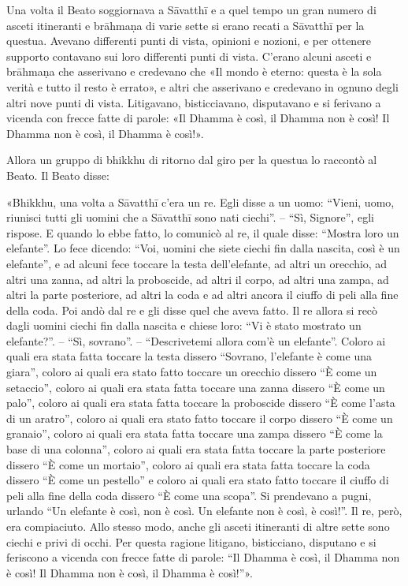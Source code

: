 

Una volta il Beato soggiornava a Sāvatthī e a quel tempo un gran numero
di asceti itineranti e brāhmaṇa di varie sette si erano recati a
Sāvatthī per la questua. Avevano differenti punti di vista, opinioni e
nozioni, e per ottenere supporto contavano sui loro differenti punti di
vista. C’erano alcuni asceti e brāhmaṇa che asserivano e credevano che
«Il mondo è eterno: questa è la sola verità e tutto il resto è errato»,
e altri che asserivano e credevano in ognuno degli altri nove punti di
vista. Litigavano, bisticciavano, disputavano e si ferivano a vicenda
con frecce fatte di parole: «Il Dhamma è così, il Dhamma non è così! Il
Dhamma non è così, il Dhamma è così!».


Allora un gruppo di bhikkhu di ritorno dal giro per la questua lo
raccontò al Beato. Il Beato disse:


«Bhikkhu, una volta a Sāvatthī c’era un re. Egli disse a un uomo:
“Vieni, uomo, riunisci tutti gli uomini che a Sāvatthī sono nati
ciechi”. – “Sì, Signore”, egli rispose. E quando lo ebbe fatto, lo
comunicò al re, il quale disse: “Mostra loro un elefante”. Lo fece
dicendo: “Voi, uomini che siete ciechi fin dalla nascita, così è un
elefante”, e ad alcuni fece toccare la testa dell’elefante, ad altri un
orecchio, ad altri una zanna, ad altri la proboscide, ad altri il corpo,
ad altri una zampa, ad altri la parte posteriore, ad altri la coda e ad
altri ancora il ciuffo di peli alla fine della coda. Poi andò dal re e
gli disse quel che aveva fatto. Il re allora si recò dagli uomini ciechi
fin dalla nascita e chiese loro: “Vi è stato mostrato un elefante?”. –
“Sì, sovrano”. – “Descrivetemi allora com’è un elefante”. Coloro ai
quali era stata fatta toccare la testa dissero “Sovrano, l’elefante è
come una giara”, coloro ai quali era stato fatto toccare un orecchio
dissero “È come un setaccio”, coloro ai quali era stata fatta toccare
una zanna dissero “È come un palo”, coloro ai quali era stata fatta
toccare la proboscide dissero “È come l’asta di un aratro”, coloro ai
quali era stato fatto toccare il corpo dissero “È come un granaio”,
coloro ai quali era stata fatta toccare una zampa dissero “È come la
base di una colonna”, coloro ai quali era stata fatta toccare la parte
posteriore dissero “È come un mortaio”, coloro ai quali era stata fatta
toccare la coda dissero “È come un pestello” e coloro ai quali era stato
fatto toccare il ciuffo di peli alla fine della coda dissero “È come una
scopa”. Si prendevano a pugni, urlando “Un elefante è così, non è così.
Un elefante non è così, è così!”. Il re, però, era compiaciuto. Allo
stesso modo, anche gli asceti itineranti di altre sette sono ciechi e
privi di occhi. Per questa ragione litigano, bisticciano, disputano e si
feriscono a vicenda con frecce fatte di parole: “Il Dhamma è così, il
Dhamma non è così! Il Dhamma non è così, il Dhamma è così!”».


